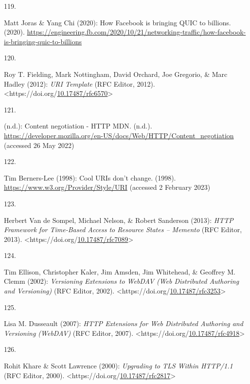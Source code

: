 \begin{thebibliography}{9}
\hypertarget{ref-joras2020}{}
119.

Matt Joras \& Yang Chi (2020): How {Facebook} is bringing {QUIC} to
billions. (2020).
\url{https://engineering.fb.com/2020/10/21/networking-traffic/how-facebook-is-bringing-quic-to-billions}

\hypertarget{ref-rfc6570}{}
120.

Roy T. Fielding, Mark Nottingham, David Orchard, Joe Gregorio, \& Marc
Hadley (2012): \emph{{URI Template}} ({RFC Editor}, 2012).
\textless https://doi.org/\href{https://doi.org/10.17487/rfc6570}{10.17487/rfc6570}\textgreater{}

\hypertarget{ref-ContentNegotiationHTTP}{}
121.

(n.d.): Content negotiation - {HTTP} \textbar{} {MDN}. (n.d.).
\url{https://developer.mozilla.org/en-US/docs/Web/HTTP/Content_negotiation}
(accessed 26 May 2022)

\hypertarget{ref-berners-lee-cool-uris}{}
122.

Tim Berners-Lee (1998): Cool {URIs} don't change. (1998).
\url{https://www.w3.org/Provider/Style/URI} (accessed 2 February 2023)

\hypertarget{ref-rfc7089}{}
123.

Herbert Van de Sompel, Michael Nelson, \& Robert Sanderson (2013):
\emph{{HTTP Framework} for {Time-Based Access} to {Resource States} --
{Memento}} ({RFC Editor}, 2013).
\textless https://doi.org/\href{https://doi.org/10.17487/rfc7089}{10.17487/rfc7089}\textgreater{}

\hypertarget{ref-rfc3253}{}
124.

Tim Ellison, Christopher Kaler, Jim Amsden, Jim Whitehead, \& Geoffrey
M. Clemm (2002): \emph{Versioning {Extensions} to {WebDAV} ({Web
Distributed Authoring} and {Versioning})} ({RFC Editor}, 2002).
\textless https://doi.org/\href{https://doi.org/10.17487/rfc3253}{10.17487/rfc3253}\textgreater{}

\hypertarget{ref-rfc4918}{}
125.

Lisa M. Dusseault (2007): \emph{{HTTP Extensions} for {Web Distributed
Authoring} and {Versioning} ({WebDAV})} ({RFC Editor}, 2007).
\textless https://doi.org/\href{https://doi.org/10.17487/rfc4918}{10.17487/rfc4918}\textgreater{}

\hypertarget{ref-rfc2817}{}
126.

Rohit Khare \& Scott Lawrence (2000): \emph{Upgrading to {TLS Within
HTTP}/1.1} ({RFC Editor}, 2000).
\textless https://doi.org/\href{https://doi.org/10.17487/rfc2817}{10.17487/rfc2817}\textgreater{}


\end{thebibliography}
